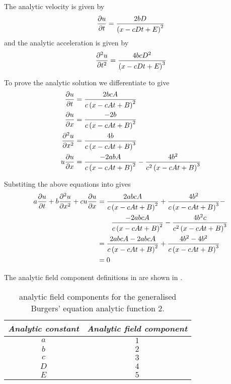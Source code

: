 The analytic velocity is given by
\begin{equation}
   \dfrac{\partial u}{\partial t} =\dfrac{2bD}{\left( x-cDt+E \right)^{2}}
\end{equation}
and the analytic acceleration is given by
\begin{equation}
   \dfrac{\partial^{2} u}{\partial {t}^{2}} =\dfrac{4bcD^{2}}{\left( x-cDt+E \right)^{3}}
\end{equation}

To prove the analytic solution we differentiate  to give
\begin{align}
  \delby{u}{t} &= \dfrac{2bcA}{c\pbrac{x-cAt+B}^{2}} \\
  \delby{u}{x} &= \dfrac{-2b}{c\pbrac{x-cAt+B}^{2}} \\
  \deltwosqby{u}{x} &= \dfrac{4b}{c\pbrac{x-cAt+B}^{3}} \\
  u\delby{u}{x} &= \dfrac{-2abA}{c\pbrac{x-cAt+B}^{2}} - \dfrac{4b^{2}}{c^{2}\pbrac{x-cAt+B}^{3}}  \\
  \label{eqn:GeneralisedBurgersEquationAnalyticOneDim2Derivatives}
\end{align}

Substiting the above equations into
 gives
\begin{align}
  a \dfrac{\partial u}{\partial t} +b \dfrac{\partial^{2} u}{\partial {x}^{2}} +cu \dfrac{\partial u}{\partial x}  &=
  \dfrac{2abcA}{c\left( x-cAt+B \right)^{2}}+\dfrac{4b^{2}}{c\left( x-cAt+B \right)^{3}}- \\
  & \qquad \dfrac{-2abcA}{c\left( x-cAt+B \right)^{2}}-\dfrac{4b^{2}c}{c^{2}\left( x-cAt+B \right)^{3}} \\
  &=\dfrac{2abcA-2abcA}{c\left( x-cAt+B \right)^{2}}+\dfrac{4b^{2}-4b^{2}}{c\left( x-cAt+B \right)^{3}}\\
  &= 0
\end{align}

The analytic field component definitions in \OpenCMISS are shown in
.

\begin{table}[htb] \centering
  \begin{tabular}{|c|c|} \hline
    \emph{Analytic constant} & \emph{Analytic field component} \\ \hline \hline
    $a$ & $1$ \\ 
    $b$ & $2$ \\ 
    $c$ & $3$ \\ 
    $D$ & $4$ \\ 
    $E$ & $5$ \\ \hline
  \end{tabular}
  \caption{\OpenCMISS analytic field components for the \oned generalised Burgers' equation
    analytic function 2.}
  \label{tab:OpenCMISSAnalyticFieldGeneralBurgersEquationOneDim2}
\end{table}


